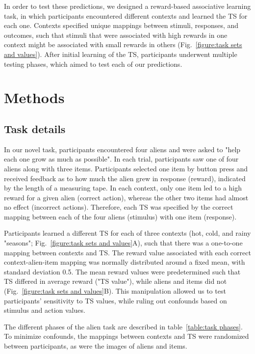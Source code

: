 \documentclass[10pt, letterpaper]{article}
\begin{document}
In order to test these predictions, we designed a reward-based associative learning task, in which participants encountered different contexts and learned the TS for each one. Contexts specified unique mappings between stimuli, responses, and outcomes, such that stimuli that were associated with high rewards in one context might be associated with small rewards in others (Fig.~\ref{figure:task sets and values}). After initial learning of the TS, participants underwent multiple testing phases, which aimed to test each of our predictions.


\section{Methods}

\subsection{Task details}

In our novel task, participants encountered four aliens and were asked to "help each one grow as much as possible". In each trial, participants saw one of four aliens along with three items. Participants selected one item by button press and received feedback as to how much the alien grew in response (reward), indicated by the length of a measuring tape. In each context, only one item led to a high reward for a given alien (correct action), whereas the other two items had almost no effect (incorrect actions). Therefore, each TS was specified by the correct mapping between each of the four aliens (stimulus) with one item (response).

Participants learned a different TS for each of three contexts (hot, cold, and rainy "seasons"; Fig.~\ref{figure:task sets and values}A), such that there was a one-to-one mapping between contexts and TS. The reward value associated with each correct context-alien-item mapping was normally distributed around a fixed mean, with standard deviation 0.5. The mean reward values were predetermined such that TS differed in average reward ("TS value"), while aliens and items did not (Fig.~\ref{figure:task sets and values}B). This manipulation allowed us to test participants' sensitivity to TS values, while ruling out confounds based on stimulus and action values. 

The different phases of the alien task are described in table~\ref{table:task phases}. To minimize confounds, the mappings between contexts and TS were randomized between participants, as were the images of aliens and items.
\end{document}
